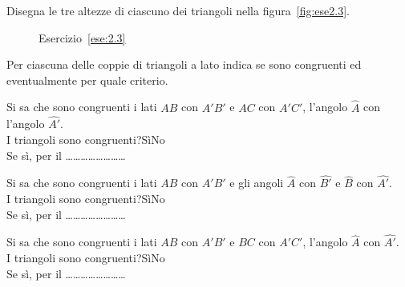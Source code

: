 \begin{esercizio}
Disegna le tre altezze di ciascuno dei triangoli nella 
figura~\ref{fig:ese2.3}.
\end{esercizio}


\begin{inaccessibleblock}
 \begin{figure}[htb]
\centering
\caption{Esercizio~\ref{ese:2.3}}%
\end{figure}
\end{inaccessibleblock}

\begin{esercizio}
Per ciascuna delle coppie di triangoli a lato indica se sono 
congruenti ed eventualmente per quale criterio.\\
\begin{minipage}{.5\linewidth}
\begin{enumeratea}
\item Si sa che sono congruenti i lati \(AB\) con \(A'B'\) e \(AC\) con 
\(A'C'\), l'angolo \(\widehat{A}\) con l'angolo \(\widehat{A'}\).\\
I triangoli sono congruenti?\tab	Sì\quad	No\\
Se sì, per il \ldots\ldots\ldots\ldots\ldots\ldots\ldots\ldots

\item Si sa che sono congruenti i lati \(AB\) con \(A'B'\) e gli angoli 
\(\widehat{A}\) con \(\widehat{B'}\) e \(\widehat{B}\) con \(\widehat{A'}\).\\
I triangoli sono congruenti?\tab	Sì\quad	No\\
Se sì, per il \ldots\ldots\ldots\ldots\ldots\ldots\ldots\ldots

\item Si sa che sono congruenti i lati \(AB\) con \(A'B'\) e \(BC\) con 
\(A'C'\), l'angolo \(\widehat{A}\) con \(\widehat{A'}\).\\
I triangoli sono congruenti?\tab	Sì\quad	No\\
Se sì, per il \ldots\ldots\ldots\ldots\ldots\ldots\ldots\ldots
\end{enumeratea}
\end{minipage}\hfil
\begin{minipage}{.4\linewidth}
  \centering
    
\end{minipage}
\end{esercizio}

